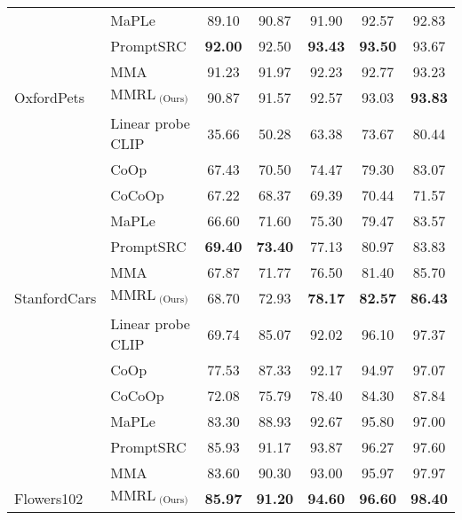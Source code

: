 \begin{table*}[t]
{{\begin{tabular}{@{}ll|ccccc}
     &
      MaPLe &
      89.10 &
      90.87 &
      91.90 &
      92.57 &
      92.83 \\
     &
      PromptSRC &
      \textbf{92.00} &
      92.50 &
      \textbf{93.43} &
      \textbf{93.50} &
      93.67 \\
     &
      MMA &
      91.23 &
      91.97 &
      92.23 &
      92.77 &
      93.23 \\
    \multirow{-7}{*}{OxfordPets} &
      \cellcolor[HTML]{E8E8E8}$\text{MMRL}_{\text{ (Ours)}}$ &
      \cellcolor[HTML]{E8E8E8}90.87 &
      \cellcolor[HTML]{E8E8E8}91.57 &
      \cellcolor[HTML]{E8E8E8}92.57 &
      \cellcolor[HTML]{E8E8E8}93.03 &
      \cellcolor[HTML]{E8E8E8}\textbf{93.83} \\ \midrule
     &
      Linear probe CLIP &
      35.66 &
      50.28 &
      63.38 &
      73.67 &
      80.44 \\
     &
      CoOp &
      67.43 &
      70.50 &
      74.47 &
      79.30 &
      83.07 \\
     &
      CoCoOp &
      67.22 &
      68.37 &
      69.39 &
      70.44 &
      71.57 \\
     &
      MaPLe &
      66.60 &
      71.60 &
      75.30 &
      79.47 &
      83.57 \\
     &
      PromptSRC &
      \textbf{69.40} &
      \textbf{73.40} &
      77.13 &
      80.97 &
      83.83 \\
     &
      MMA &
      67.87 &
      71.77 &
      76.50 &
      81.40 &
      85.70 \\
    \multirow{-7}{*}{StanfordCars} &
      \cellcolor[HTML]{E8E8E8}$\text{MMRL}_{\text{ (Ours)}}$ &
      \cellcolor[HTML]{E8E8E8}68.70 &
      \cellcolor[HTML]{E8E8E8}72.93 &
      \cellcolor[HTML]{E8E8E8}\textbf{78.17} &
      \cellcolor[HTML]{E8E8E8}\textbf{82.57} &
      \cellcolor[HTML]{E8E8E8}\textbf{86.43} \\ \midrule
     &
      Linear probe CLIP &
      69.74 &
      85.07 &
      92.02 &
      96.10 &
      97.37 \\
     &
      CoOp &
      77.53 &
      87.33 &
      92.17 &
      94.97 &
      97.07 \\
     &
      CoCoOp &
      72.08 &
      75.79 &
      78.40 &
      84.30 &
      87.84 \\
     &
      MaPLe &
      83.30 &
      88.93 &
      92.67 &
      95.80 &
      97.00 \\
     &
      PromptSRC &
      85.93 &
      91.17 &
      93.87 &
      96.27 &
      97.60 \\
     &
      MMA &
      83.60 &
      90.30 &
      93.00 &
      95.97 &
      97.97 \\
    \multirow{-7}{*}{Flowers102} &
      \cellcolor[HTML]{E8E8E8}$\text{MMRL}_{\text{ (Ours)}}$ &
      \cellcolor[HTML]{E8E8E8}\textbf{85.97} &
      \cellcolor[HTML]{E8E8E8}\textbf{91.20} &
      \cellcolor[HTML]{E8E8E8}\textbf{94.60} &
      \cellcolor[HTML]{E8E8E8}\textbf{96.60} &
      \cellcolor[HTML]{E8E8E8}\textbf{98.40} \\ \bottomrule
    \end{tabular}
    }
    }
\end{table*}


